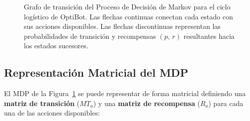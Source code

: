 \begin{figure}[!htb]
\caption{Grafo de transición del Proceso de Decisión de Markov para el ciclo logístico de OptiBot. Las flechas continuas conectan cada estado con sus acciones disponibles. Las flechas discontinuas representan las probabilidades de transición y recompensas $(p, \, r)$ resultantes hacia los estados sucesores.}
\label{fig:optibot_mdp_graph}
\end{figure}

\subsection{Representación Matricial del MDP}
El MDP de la Figura~\ref{fig:optibot_mdp_graph} se puede representar de forma matricial definiendo una \textbf{matriz de transición} ($MT_a$) y una \textbf{matriz de recompensa} ($R_a$) para cada una de las acciones disponibles:


